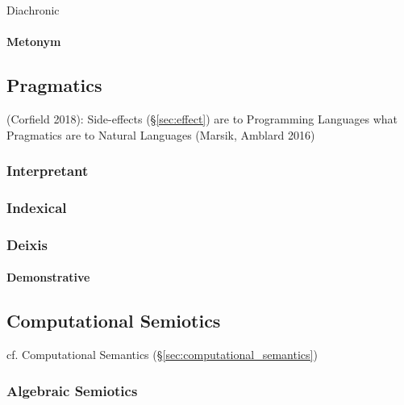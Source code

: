 Diachronic

\paragraph{Metonym}\label{sec:metonym}\hfill



\subsection{Pragmatics}\label{sec:pragmatics}

(Corfield 2018): Side-effects (\S\ref{sec:effect}) are to Programming Languages
what Pragmatics are to Natural Languages (Marsik, Amblard 2016)



\subsubsection{Interpretant}\label{sec:interpretant}

\subsubsection{Indexical}\label{sec:indexical}

\subsubsection{Deixis}\label{sec:deixis}

\paragraph{Demonstrative}\label{sec:demonstrative}\hfill



\subsection{Computational Semiotics}\label{sec:computational_semiotics}

cf. Computational Semantics (\S\ref{sec:computational_semantics})



\subsubsection{Algebraic Semiotics}\label{sec:algebraic_semiotics}
